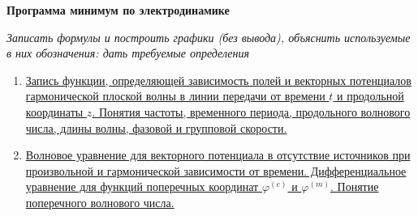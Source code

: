 \documentclass[a4paper,14pt]{extarticle}
\renewcommand{\phi}{\varphi}
\begin{document}
	\begin{center}
		\Large \textbf{Программа минимум по электродинамике}
	\end{center}
		\textit{Записать формулы и построить графики (без вывода), объяснить используемые в них обозначения: дать требуемые определения}
	\begin{enumerate}
		\item 
		\hyperlink{num1}{Запись функции, определяющей зависимость полей и векторных потенциалов гармонической плоской волны в линии передачи от времени $t$ и продольной координаты $z$. Понятия частоты, временного периода, продольного волнового числа, длины волны, фазовой и групповой скорости.}
		
		\item 
		\hyperlink{num2}{Волновое уравнение для векторного потенциала в отсутствие источников при произвольной и гармонической зависимости от времени. Дифференциальное уравнение для функций поперечных координат $\phi^{(e)}$ и $\phi^{(m)}$. Понятие поперечного волнового числа.}
		

\end{enumerate}
\end{document}
